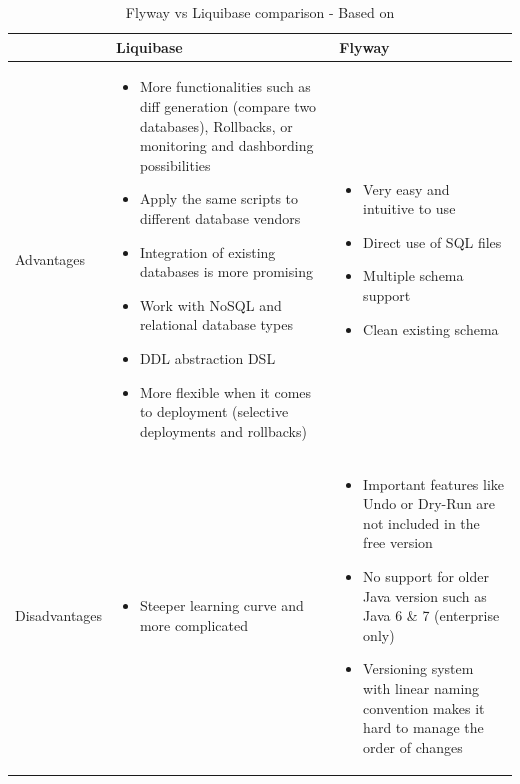 \begin{table}[H]
	\centering
		    \begin{tabular}{|l|p{}|p{}|}
		    \hline
			 & Liquibase & Flyway\\ \hline
			 \begin{turn}{-90}Advantages\end{turn} &
			\begin{itemize}
				\item More functionalities such as diff generation (compare two databases), Rollbacks, or monitoring and dashbording possibilities
				\item Apply the same scripts to different database vendors
				\item Integration of existing databases is more promising
				\item Work with NoSQL and relational database types
				\item DDL abstraction DSL
				\item More flexible when it comes to deployment (selective deployments and rollbacks)
			\end{itemize} & \begin{itemize}
				\item Very easy and intuitive to use
				\item Direct use of SQL files
				\item Multiple schema support
				\item Clean existing schema
			\end{itemize}\\ \hline
		
	 \begin{turn}{-90}Disadvantages\end{turn} &
		\begin{itemize}
			\item Steeper learning curve and more complicated 
		\end{itemize} & \begin{itemize}
			\item Important features like Undo or Dry-Run are not included in the free version 
			\item No support for older Java version such as Java 6 \& 7 (enterprise only)
			\item Versioning system with linear naming convention makes it hard to manage the order of changes
		\end{itemize}\\ \hline
		\end{tabular}
	\caption{Flyway vs Liquibase comparison - Based on \cite{Parsick2018, Kaps2016}}
	\label{tab:flyway_liquivase_conparison}
\end{table}

